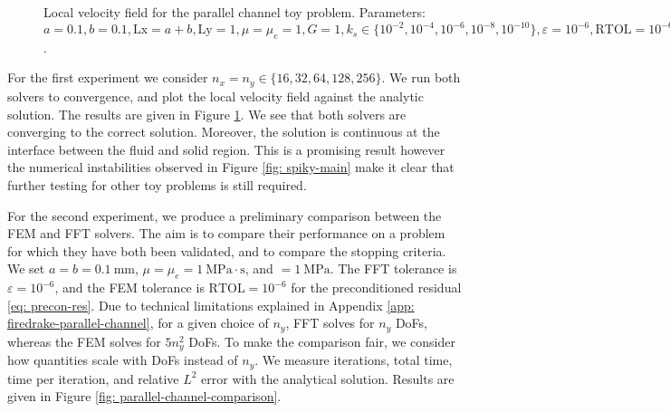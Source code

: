 \documentclass[12pt]{article}
\theoremstyle{theorem}
\begin{document}
\begin{figure}[h!]
    \centering
  
    \hfill
    \label{fig: pc-vanka}
  
    \caption{Local velocity field for the parallel channel toy problem. Parameters: $a = 0.1, b=0.1, \mathrm{Lx} = a+b, \mathrm{Ly}=1, \mu=\mu_e=1, G=1, k_s \in \{10^{-2}, 10^{-4}, 10^{-6}, 10^{-8}, 10^{-10}\}, \varepsilon = 10^{-6}, \mathrm{RTOL} = 10^{-6} \text{(preconditioned)}$.}
    \label{fig: pc-validation} 
\end{figure}

For the first experiment we consider $n_x = n_y \in \{16, 32, 64, 128, 256\}$. We run both solvers to convergence, and plot the local velocity field against the analytic solution. The results are given in Figure \ref{fig: pc-validation}. We see that both solvers are converging to the correct solution. Moreover, the solution is continuous at the interface between the fluid and solid region. This is a promising result however the numerical instabilities observed in Figure \ref{fig: spiky-main} make it clear that further testing for other toy problems is still required.

For the second experiment, we produce a preliminary comparison between the FEM and FFT solvers. The aim is to compare their performance on a problem for which they have both been validated, and to compare the stopping criteria. We set $a = b = 0.1~\mathrm{mm}$, $\mu = \mu_e = 1~\mathrm{MPa}\cdot\mathrm{s}$, and $= 1~\mathrm{MPa}.$ The FFT tolerance is $\varepsilon=10^{-6}$, and the FEM tolerance is $\mathrm{RTOL} = 10^{-6}$ for the preconditioned residual \eqref{eq: precon-res}. Due to technical limitations explained in Appendix \ref{app: firedrake-parallel-channel}, for a given choice of $n_y$, FFT solves for $n_y$ DoFs, whereas the FEM solves for $5n_y^2$ DoFs. To make the comparison fair, we consider how quantities scale with DoFs instead of $n_y$. We measure iterations, total time, time per iteration, and relative $L^2$ error with the analytical solution. Results are given in Figure \ref{fig: parallel-channel-comparison}.
\end{document}

